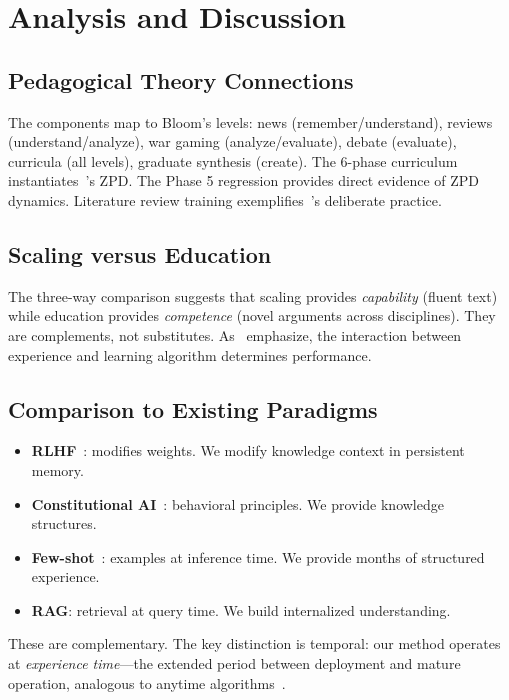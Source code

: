 \documentclass[11pt,a4paper]{article}
\begin{document}
\section{Analysis and Discussion}\label{sec:discussion}

\subsection{Pedagogical Theory Connections}
The components map to Bloom's levels: news (remember/understand), reviews (understand/analyze), war gaming (analyze/evaluate), debate (evaluate), curricula (all levels), graduate synthesis (create). The 6-phase curriculum instantiates~\citeauthor{vygotsky1978mind}'s ZPD. The Phase 5 regression provides direct evidence of ZPD dynamics. Literature review training exemplifies~\citeauthor{ericsson1993role}'s deliberate practice.

\subsection{Scaling versus Education}
The three-way comparison suggests that scaling provides \emph{capability} (fluent text) while education provides \emph{competence} (novel arguments across disciplines). They are complements, not substitutes. As~\citet{sutton2018reinforcement} emphasize, the interaction between experience and learning algorithm determines performance.

\subsection{Comparison to Existing Paradigms}
\begin{itemize}[nosep]
  \item \textbf{RLHF}~\citep{christiano2017deep,ouyang2022training}: modifies weights. We modify knowledge context in persistent memory.
  \item \textbf{Constitutional AI}~\citep{bai2022constitutional}: behavioral principles. We provide knowledge structures.
  \item \textbf{Few-shot}~\citep{brown2020language}: examples at inference time. We provide months of structured experience.
  \item \textbf{RAG}: retrieval at query time. We build internalized understanding.
\end{itemize}
These are complementary. The key distinction is temporal: our method operates at \emph{experience time}---the extended period between deployment and mature operation, analogous to anytime algorithms~\citep{zilberstein1996using}.
\end{document}
